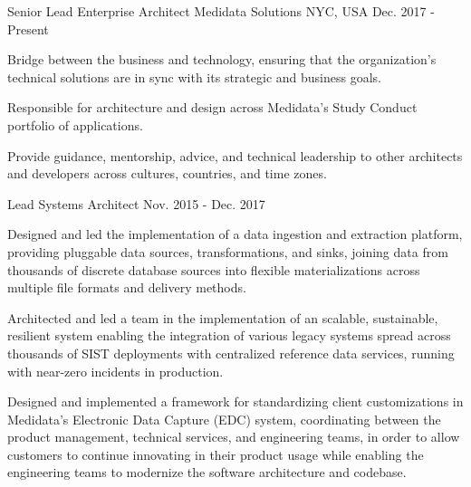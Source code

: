 

\begin{cventries}

  \cventry
    {Senior Lead Enterprise Architect} %
    {Medidata Solutions} %
    {NYC, USA} %
    {Dec. 2017 - Present} %
    {
      \begin{cvitems} %
        \item {
          Bridge between the business and technology, ensuring that the organization's technical solutions are
          in sync with its strategic and business goals.
        }
        \item {Responsible for architecture and design across Medidata's Study Conduct portfolio of applications.}
        \item {
          Provide guidance, mentorship, advice, and technical leadership to other architects and developers across
          cultures, countries, and time zones.
        }
      \end{cvitems}
    }
    
  \cventry
    {Lead Systems Architect}
    {}
    {}
    {Nov. 2015 - Dec. 2017}
    {
        \begin{cvitems}
          \item {
            Designed and led the implementation of a data ingestion and extraction platform, providing pluggable data 
            sources, transformations, and sinks, joining data from thousands of discrete database sources into flexible
            materializations across multiple file formats and delivery methods.
          }
          \item {
            Architected and led a team in the implementation of an scalable, sustainable, resilient system enabling the
            integration of various legacy systems spread across thousands of SIST deployments with centralized
            reference data services, running with near-zero incidents in production.
          }
          \item {
            Designed and implemented a framework for standardizing client customizations in Medidata's Electronic Data
            Capture (EDC) system, coordinating between the product management, technical services, and engineering
            teams, in order to allow customers to continue innovating in their product usage while enabling
            the engineering teams to modernize the software architecture and codebase.
          }
        \end{cvitems}
    }
    

\end{cventries}
